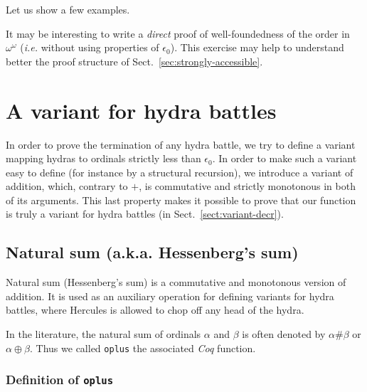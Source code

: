 
    Let us show a few examples.
    

    
\begin{exercise}
  It may be interesting to write a \emph{direct} proof  of well-foundedness of the order in $\omega^\omega$ (\emph{i.e.}
  without using properties of $\epsilon_0$). This exercise may
  help to understand better the proof structure of Sect.~\vref{sec:strongly-accessible}.
    \end{exercise}
    \section{A variant for hydra battles}

    In order to prove the termination of any hydra battle, we try to define a variant mapping hydras to ordinals strictly less than $\epsilon_0$.
    In order to make such a variant easy to define (for instance by a structural recursion), we introduce a variant of addition, which, contrary to
    $+$, is commutative and strictly monotonous in both of its arguments. This last property makes it possible to prove that our function is 
    truly a variant for hydra battles (in Sect.~\vref{sect:variant-decr}).

    \subsection{Natural sum (a.k.a. Hessenberg's  sum)}
    \label{sec:orgheadline87}
    \label{hydra-variant}
    \label{sect:hessenberg-def}
    
    Natural sum (Hessenberg's  sum) is a commutative and monotonous version of
    addition. It is used as an auxiliary operation  for defining variants
    for hydra battles, where Hercules is allowed to chop off any  head of the hydra.

    In the literature, the natural sum of ordinals \(\alpha\) and \(\beta\)
    is often denoted by \(\alpha \# \beta\)  or  \(\alpha \oplus  \beta\).
    Thus we called \texttt{oplus} the associated \emph{Coq} function.

    \subsubsection{Definition of \texttt{oplus}}
    \label{sec:orgheadline84}


